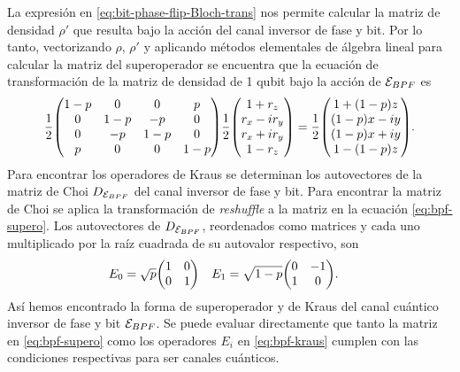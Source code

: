 La expresión en \eqref{eq:bit-phase-flip-Bloch-trans} nos 
permite calcular la matriz de densidad $\rho'$ que resulta
bajo la acción del canal inversor de fase y bit. Por lo tanto, 
vectorizando $\rho$, $\rho'$ y aplicando métodos elementales de
álgebra lineal para calcular la matriz del superoperador
se encuentra que la ecuación de transformación de
la matriz de densidad de 1 qubit bajo la acción 
de $\mathcal{E}_{BPF}$ es
\begin{align}
\frac{1}{2}
\mqty(
1-p & 0 & 0 & p \\
0 & 1-p & -p & 0 \\
0 & -p & 1-p & 0 \\
p & 0 & 0 & 1-p \\
)
\frac{1}{2}
\mqty(
1+r_z\\r_x-ir_y\\r_x+ir_y\\1-r_z
)
=
\frac{1}{2}
\mqty(
1+\qty(1-p)z\\
\qty(1-p)x-i y\\
\qty(1-p)x+i y\\
1-\qty(1-p)z
).
\label{eq:bpf-supero}
\end{align}
Para encontrar los operadores de Kraus se determinan los autovectores
de la matriz de Choi $D_{\mathcal{E}_{BPF}}$ del canal inversor de fase y bit. 
Para encontrar la matriz de Choi se aplica la transformación 
de \textit{reshuffle} a la matriz en la ecuación \eqref{eq:bpf-supero}.
Los autovectores de $D_{\mathcal{E}_{BPF}}$, reordenados como matrices y
cada uno multiplicado por la raíz cuadrada de su autovalor respectivo, son
\begin{align}
E_0&=
\sqrt{p}
\mqty(
1 & 0\\
0 & 1
)&
E_1&=
\sqrt{1-p}
\mqty(
0 & -1\\
1 & 0
).
\label{eq:bpf-kraus}
\end{align}
Así hemos encontrado la forma de superoperador y de Kraus del canal
cuántico inversor de fase y bit $\mathcal{E}_{BPF}$. Se puede evaluar directamente que 
tanto la matriz en \eqref{eq:bpf-supero} como los operadores $E_i$
en \eqref{eq:bpf-kraus} cumplen con las condiciones respectivas
para ser canales cuánticos.

